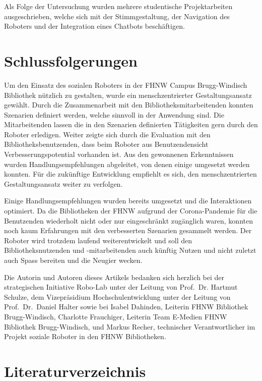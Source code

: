 \documentclass[a4paper,
fontsize=11pt,
oneside,
numbers=noperiodatend,
parskip=half-,
bibliography=totoc,
final
]{scrartcl}
\begin{document}
Als Folge der Untersuchung wurden mehrere studentische Projektarbeiten
ausgeschrieben, welche sich mit der Stimmgestaltung, der Navigation des
Roboters und der Integration eines Chatbots beschäftigen.

\hypertarget{schlussfolgerungen}{%
\section{Schlussfolgerungen}\label{schlussfolgerungen}}

Um den Einsatz des sozialen Roboters in der FHNW Campus Brugg-Windisch
Bibliothek nützlich zu gestalten, wurde ein menschzentrierter
Gestaltungsansatz gewählt. Durch die Zusammenarbeit mit den
Bibliotheksmitarbeitenden konnten Szenarien definiert werden, welche
sinnvoll in der Anwendung sind. Die Mitarbeitenden lassen die in den
Szenarien definierten Tätigkeiten gern durch den Roboter erledigen.
Weiter zeigte sich durch die Evaluation mit den Bibliotheksbenutzenden,
dass beim Roboter aus Benutzendensicht Verbesserungspotential vorhanden
ist. Aus den gewonnenen Erkenntnissen wurden Handlungsempfehlungen
abgeleitet, von denen einige umgesetzt werden konnten. Für die
zukünftige Entwicklung empfiehlt es sich, den menschzentrierten
Gestaltungsansatz weiter zu verfolgen.

Einige Handlungsempfehlungen wurden bereits umgesetzt und die
Interaktionen optimiert. Da die Bibliotheken der FHNW aufgrund der
Corona-Pandemie für die Benutzenden wiederholt nicht oder nur
eingeschränkt zugänglich waren, konnten noch kaum Erfahrungen mit den
verbesserten Szenarien gesammelt werden. Der Roboter wird trotzdem
laufend weiterentwickelt und soll den Bibliotheksnutzenden und
-mitarbeitenden auch künftig Nutzen und nicht zuletzt auch Spass
bereiten und die Neugier wecken.

Die Autorin und Autoren dieses Artikels bedanken sich herzlich bei der
strategischen Initiative Robo-Lab unter der Leitung von Prof.~Dr.
Hartmut Schulze, dem Vizepräsidium Hochschulentwicklung unter der
Leitung von Prof.~Dr.~Daniel Halter sowie bei Isabel Dahinden, Leiterin
FHNW Bibliothek Brugg-Windisch, Charlotte Frauchiger, Leiterin Team
E-Medien FHNW Bibliothek Brugg-Windisch, und Markus Recher, technischer
Verantwortlicher im Projekt soziale Roboter in den FHNW Bibliotheken.

\hypertarget{literaturverzeichnis}{%
\section{Literaturverzeichnis}\label{literaturverzeichnis}}
\end{document}
